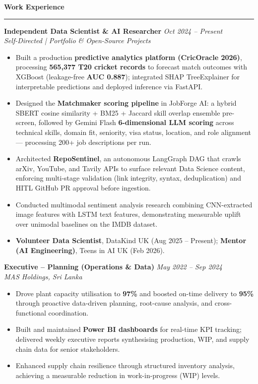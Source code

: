 \documentclass[a4paper,10pt]{article}
\newcommand{\sect}[1]{\vspace{8pt}\noindent\textbf{\color{heading}\large #1}\vspace{3pt}\hrule\vspace{6pt}}
\begin{document}
\sect{Work Experience}

\noindent\textbf{Independent Data Scientist \& AI Researcher} \hfill \textit{Oct 2024 -- Present} \\
\textit{Self-Directed | Portfolio \& Open-Source Projects}
\begin{itemize}[leftmargin=*, topsep=4pt, itemsep=2pt]
    \item Built a production \textbf{predictive analytics platform (CricOracle 2026)}, processing \textbf{565,377 T20 cricket records} to forecast match outcomes with XGBoost (leakage-free \textbf{AUC 0.887}); integrated SHAP TreeExplainer for interpretable predictions and deployed inference via FastAPI.
    \item Designed the \textbf{Matchmaker scoring pipeline} in JobForge AI: a hybrid SBERT cosine similarity + BM25 + Jaccard skill overlap ensemble pre-screen, followed by Gemini Flash \textbf{6-dimensional LLM scoring} across technical skills, domain fit, seniority, visa status, location, and role alignment — processing 200+ job descriptions per run.
    \item Architected \textbf{RepoSentinel}, an autonomous LangGraph DAG that crawls arXiv, YouTube, and Tavily APIs to surface relevant Data Science content, enforcing multi-stage validation (link integrity, syntax, deduplication) and HITL GitHub PR approval before ingestion.
    \item Conducted multimodal sentiment analysis research combining CNN-extracted image features with LSTM text features, demonstrating measurable uplift over unimodal baselines on the IMDB dataset.
    \item \textbf{Volunteer Data Scientist}, DataKind UK (Aug 2025 -- Present); \textbf{Mentor (AI Engineering)}, Teens in AI UK (Feb 2026).
\end{itemize}
\vspace{4pt}

\noindent\textbf{Executive -- Planning (Operations \& Data)} \hfill \textit{May 2022 -- Sep 2024} \\
\textit{MAS Holdings, Sri Lanka}
\begin{itemize}[leftmargin=*, topsep=2pt, itemsep=1pt]
    \item Drove plant capacity utilisation to \textbf{97\%} and boosted on-time delivery to \textbf{95\%} through proactive data-driven planning, root-cause analysis, and cross-functional coordination.
    \item Built and maintained \textbf{Power BI dashboards} for real-time KPI tracking; delivered weekly executive reports synthesising production, WIP, and supply chain data for senior stakeholders.
    \item Enhanced supply chain resilience through structured inventory analysis, achieving a measurable reduction in work-in-progress (WIP) levels.
\end{itemize}
\vspace{4pt}
\end{document}
